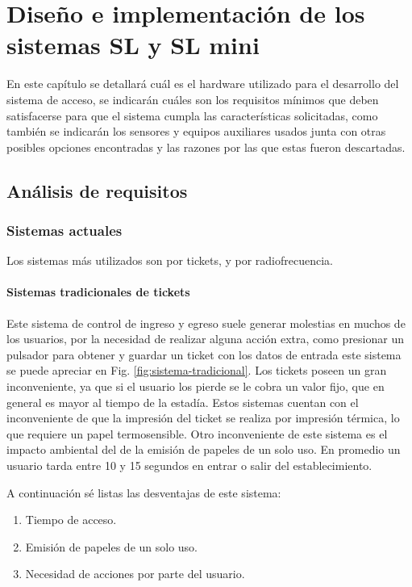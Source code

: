 \chapter{Diseño e implementación de los sistemas SL y SL mini}

En este capítulo se detallará cuál es el hardware utilizado para el desarrollo del sistema de acceso, se indicarán cuáles
son los requisitos mínimos que deben satisfacerse para que el sistema cumpla las características solicitadas, como
también se indicarán los sensores y equipos auxiliares usados junta con otras posibles opciones encontradas y las
razones por las que estas fueron descartadas.


\section{Análisis de requisitos}


\subsection{Sistemas actuales}

Los sistemas más utilizados son por tickets, y por radiofrecuencia.

\subsubsection*{Sistemas tradicionales de tickets}

Este sistema de control de ingreso y egreso suele generar molestias en muchos de los usuarios, por la necesidad de realizar alguna acción extra, como presionar un pulsador para obtener y guardar un ticket con los datos de entrada este sistema se puede apreciar en Fig. \ref{fig:sistema-tradicional}.
Los tickets poseen un gran inconveniente, ya que si el usuario los pierde se le cobra un valor fijo, que en general es mayor al tiempo de la estadía.
Estos sistemas cuentan con el inconveniente de que la impresión del ticket se realiza por impresión térmica, lo que requiere un papel termosensible.
Otro inconveniente de este sistema es el impacto ambiental del de la emisión de papeles de un solo uso. En promedio un usuario tarda entre 10 y 15 segundos en entrar o salir del establecimiento.

A continuación sé listas las desventajas de este sistema:

\begin{enumerate}
    \item Tiempo de acceso.
    \item Emisión de papeles de un solo uso.
    \item Necesidad de acciones por parte del usuario.
\end{enumerate}

